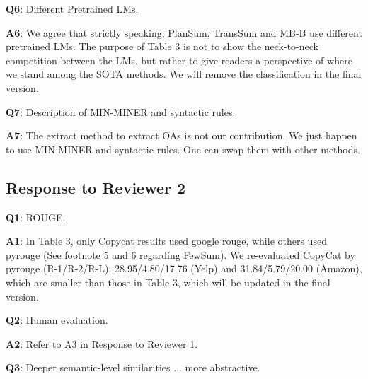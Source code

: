 \documentclass[letterpaper]{article} %
\begin{document}
\noindent 
\textbf{Q6}: Different Pretrained LMs.

\noindent 
\textbf{A6}: 
We agree that strictly speaking, PlanSum, TransSum and MB-B 
use different pretrained LMs. 
The purpose of Table 3 is not to show the neck-to-neck competition between
the LMs, but rather to give readers a perspective of where we stand among the
SOTA methods. We will remove the classification in the final version.

\noindent 
\textbf{Q7}: Description of MIN-MINER and syntactic rules.

\noindent 
\textbf{A7}: 
The extract method to extract OAs is not our contribution. We just happen to use MIN-MINER 
and syntactic rules. One can swap them with other methods. 

\subsection*{Response to Reviewer 2}
\noindent 
\textbf{Q1}: ROUGE.

\noindent 
\textbf{A1}: In Table 3, only Copycat results used google rouge, while others used
pyrouge  (See footnote 5 and 6 regarding FewSum). 
We re-evaluated CopyCat by pyrouge (R-1/R-2/R-L): 
28.95/4.80/17.76 (Yelp) and 31.84/5.79/20.00 (Amazon), which are smaller than those in Table 3,
which will be updated in the final version.


\noindent 
\textbf{Q2}: Human evaluation.

\noindent 
\textbf{A2}: 
Refer to A3 in Response to Reviewer 1.

\noindent
\textbf{Q3}: Deeper semantic-level similarities ... more abstractive.
\end{document}
